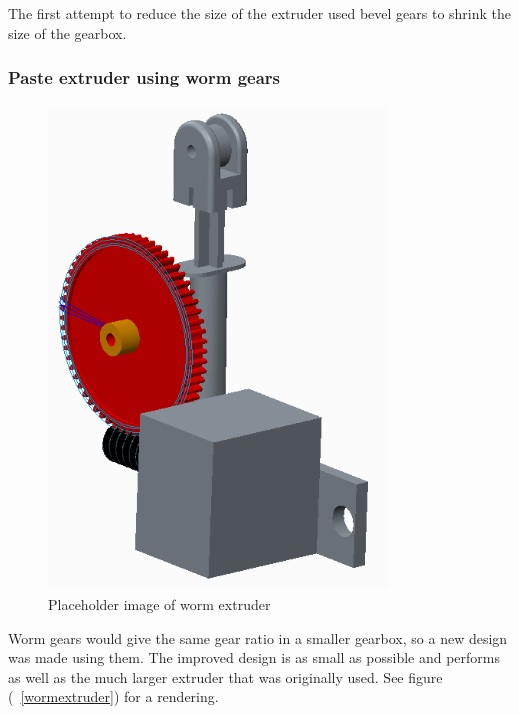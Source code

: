 The first attempt to reduce the size of the extruder used bevel gears to shrink the size of the gearbox. 

\subsubsection{Paste extruder using worm gears}
\begin{figure}[ht!]
\centering
\includegraphics[width=90mm]{resources/extruder_worm.png}
\caption{Placeholder image of worm extruder}
\label{overflow}
\end{figure}

Worm gears would give the same gear ratio in a smaller gearbox, so a new design was made using them. The improved design is as small as possible and performs as well as the much larger extruder that
was originally used. See figure (~\ref{wormextruder}) for a rendering.

